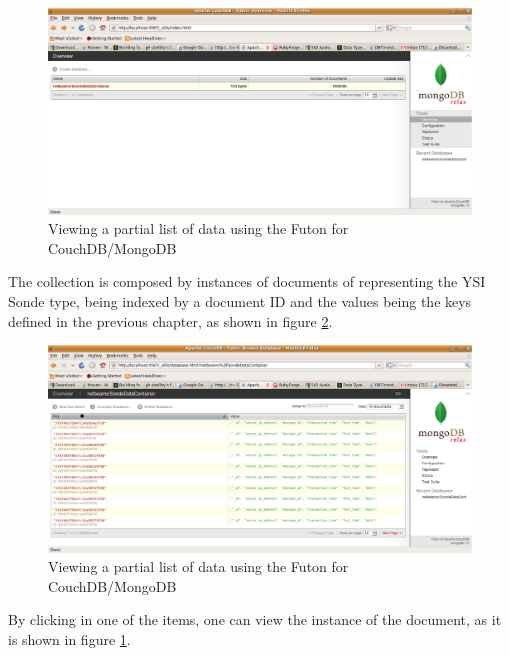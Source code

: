 \begin{figure}[h]
  \centering
  \includegraphics[scale=0.3]{../diagrams/view-collections-instance-browser-futondb}
  \caption{Viewing a partial list of data using the Futon for CouchDB/MongoDB}
  \label{fig:view-collections-instance-browser-futondb}
\end{figure}

The collection is composed by instances of documents of representing the YSI
Sonde type, being indexed by a document ID and the values being the keys
defined in the previous chapter, as shown in figure
\ref{fig:view-collected-data-list-browser-futondb}.

\begin{figure}[h]
  \centering
  \includegraphics[scale=0.3]{../diagrams/view-collected-data-list-browser-futondb}
  \caption{Viewing a partial list of data using the Futon for CouchDB/MongoDB}
  \label{fig:view-collected-data-list-browser-futondb}
\end{figure}

By clicking in one of the items, one can view the instance of the document, as
it is shown in figure \ref{fig:view-collections-instance-browser-futondb}.

